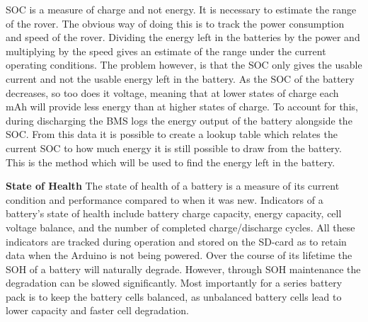 \documentclass[a4paper]{article}
\begin{document}
SOC is a measure of charge and not energy. It is necessary to estimate 
the range of the rover. The obvious way of doing this is to track the 
power consumption and speed of the rover. Dividing the energy left in 
the batteries by the power and multiplying by the speed gives an estimate 
of the range under the current operating conditions. The problem however, 
is that the SOC only gives the usable current and not the usable energy 
left in the battery. As the SOC of the battery decreases, so too does it 
voltage, meaning that at lower states of charge each mAh will provide less 
energy than at higher states of charge. To account for this, during discharging 
the BMS logs the energy output of the battery alongside the SOC. From this data 
it is possible to create a lookup table which relates the current SOC to how 
much energy it is still possible to draw from the battery. This is the method 
which will be used to find the energy left in the battery. 

\textbf{State of Health}
\vspace{10pt} 
\newline
The state of health of a battery is a measure of its current condition and 
performance compared to when it was new\cite{mpower}. Indicators of a battery’s state 
of health include battery charge capacity, energy capacity, cell voltage 
balance, and the number of completed charge/discharge cycles\cite{https://doi.org/10.1002/er.3598}. All these 
indicators are tracked during operation and stored on the SD-card as to 
retain data when the Arduino is not being powered. Over the course of its 
lifetime the SOH of a battery will naturally degrade. However, through SOH 
maintenance the degradation can be slowed significantly. Most importantly 
for a series battery pack is to keep the battery cells balanced, as 
unbalanced battery cells lead to lower capacity and faster cell degradation\cite{texas}. 
\end{document}
